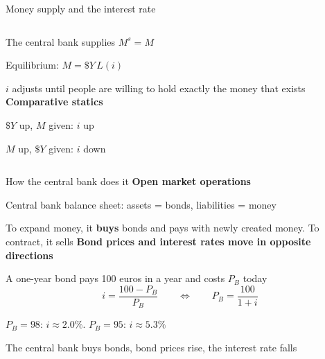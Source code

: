 \documentclass[aspectratio=169,xcolor=table]{beamer}
\begin{document}
\begin{frame}{Money supply and the interest rate}
\begin{columns}[c]
\begin{column}{0.5\textwidth}
\small
\bi
  \item The central bank supplies $M^s = M$
  \item Equilibrium: $M = \$Y\,L(i)$
  \item $i$ adjusts until people are willing to hold exactly the money that exists
\ei
\vspace{0.1cm}
\textbf{Comparative statics}
\bi
  \item $\$Y$ up, $M$ given: $i$ up
  \item $M$ up, $\$Y$ given: $i$ down
\ei
\end{column}
\begin{column}{0.47\textwidth}
\centering
{}
\end{column}
\end{columns}
\end{frame}

\begin{frame}{How the central bank does it}
\small
\textbf{Open market operations}
\bi
  \item Central bank balance sheet: assets = bonds, liabilities = money
  \item To expand money, it \textbf{buys} bonds and pays with newly created money. To contract, it sells
\ei
\vspace{0.1cm}
\textbf{Bond prices and interest rates move in opposite directions}
\bi
  \item A one-year bond pays 100 euros in a year and costs $P_B$ today
  \[
  i = \frac{100 - P_B}{P_B} \qquad\Longleftrightarrow\qquad P_B = \frac{100}{1+i}
  \]
  \item $P_B = 98$: $i \approx 2.0\%$. $P_B = 95$: $i \approx 5.3\%$
  \item The central bank buys bonds, bond prices rise, the interest rate falls
\ei
\end{frame}
\end{document}
